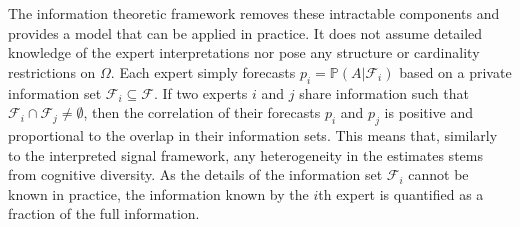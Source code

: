 \documentclass[11pt,twoside]{article}
\renewcommand{\P}{\mathbb{P}}
\begin{document}
The information theoretic framework removes these intractable components and provides a model that can be applied in practice. It does not assume detailed knowledge of the expert interpretations nor pose any structure or cardinality restrictions on $\Omega$.  Each expert simply forecasts $p_i = \P\left(A | \mathcal{F}_i\right)$ based on a private information set $\mathcal{F}_i \subseteq \mathcal{F}$. 
If two experts $i$ and $j$ share information such that $\mathcal{F}_i \cap \mathcal{F}_j \neq \emptyset$, then the correlation of their forecasts $p_i$ and $p_j$ is positive and proportional to the overlap in their information sets. This means that, similarly to the interpreted signal framework, any heterogeneity in the estimates stems from cognitive diversity. As the details of the information set $\mathcal{F}_i$ cannot be known in practice, the information known by the $i$th expert is quantified as a fraction of the full information. 

\end{document}
